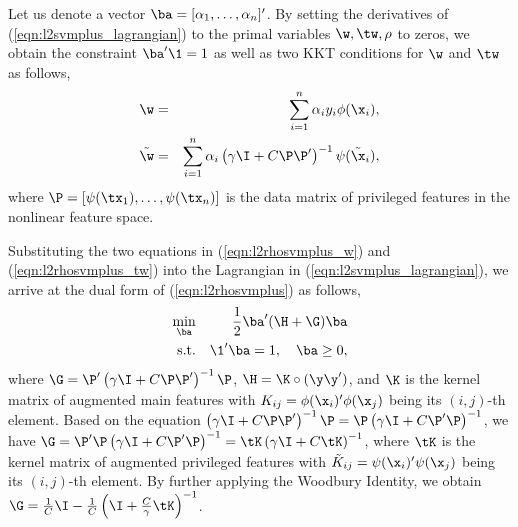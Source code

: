 Let us denote a vector $\ba = [\alpha_1, \ldots, \alpha_n]'$. By setting the derivatives of (\ref{eqn:l2svmplus_lagrangian}) \wrt to the primal variables $\w, \tw, \rho$ to zeros, we obtain the constraint $\ba'\1 = 1$ as well as two KKT conditions for $\w$ and $\tw$ as follows,
\begin{eqnarray}
\w &=& \sum_{i=1}^n\alpha_iy_i\phi(\x_i),\label{eqn:l2rhosvmplus_w}\\
\tilde{\w} &=& \sum_{i=1}^n\alpha_i\left(\gamma\I + C\P\P'\right)^{-1}\psi(\tilde{\x}_i),\label{eqn:l2rhosvmplus_tw}
\end{eqnarray}
where $\P = [\psi(\tx_1), \ldots, \psi(\tx_n)]$ is the data matrix of privileged features in the nonlinear feature space.

Substituting the two equations in (\ref{eqn:l2rhosvmplus_w}) and (\ref{eqn:l2rhosvmplus_tw}) into the Lagrangian in (\ref{eqn:l2svmplus_lagrangian}), we arrive at the dual form of (\ref{eqn:l2rhosvmplus}) as follows,
\begin{eqnarray}\label{eqn:l2svmplus_dual}
\min_{\ba} && \frac{1}{2}\ba'(\H + \G)\ba\\
\mbox{s.t.} && \1'\ba = 1, \quad \ba \geq 0,\nonumber
\end{eqnarray}
where $\G = \P'\left(\gamma\I + C\P\P'\right)^{-1}\P$, $\H = \K\circ(\y\y')$, and $\K$ is the kernel matrix of augmented main features with $K_{ij} = \phi(\x_i)'\phi(\x_j)$ being its $(i,j)$-th element. Based on the equation $\left(\gamma\I + C\P\P'\right)^{-1}\P = \P\left(\gamma\I + C\P'\P\right)^{-1}$, we have $ \G = \P'\P\left(\gamma\I + C\P'\P\right)^{-1} = \tK\left(\gamma\I + C\tK\right)^{-1}$, where $\tK$ is the kernel matrix of augmented privileged features with $\tilde{K}_{ij} = \psi(\x_i)'\psi(\x_j)$ being its $(i,j)$-th element. By further applying the Woodbury Identity, we obtain $\G = \frac{1}{C}\I - \frac{1}{C}\left(\I+\frac{C}{\gamma}\tK\right)^{-1}$.

